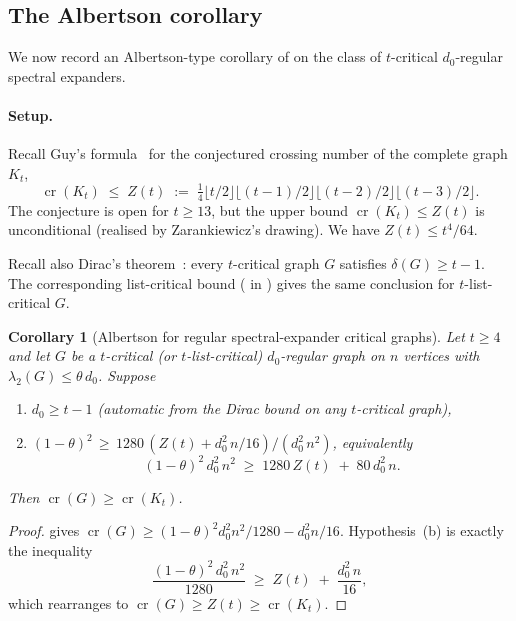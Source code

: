 \documentclass[11pt,a4paper]{article}
\newtheorem{corollary}[theorem]{Corollary}
\theoremstyle{definition}
\DeclareMathOperator{\crN}{cr}
\begin{document}
\subsection{The Albertson corollary}\label{ssec:albertson}

We now record an Albertson-type corollary of 
on the class of $t$-critical $d_0$-regular spectral expanders.

\paragraph{Setup.}
Recall Guy's formula~\cite{Guy} for the conjectured crossing number
of the complete graph $K_t$,
\[
   \crN(K_t) \;\le\; Z(t) \;:=\; \tfrac{1}{4} \lfloor t/2 \rfloor \lfloor (t-1)/2 \rfloor
                 \lfloor (t-2)/2 \rfloor \lfloor (t-3)/2 \rfloor.
\]
The conjecture is open for $t \ge 13$, but the upper bound
$\crN(K_t) \le Z(t)$ is unconditional (realised by Zarankiewicz's
drawing). We have $Z(t) \le t^{4}/64$.

Recall also Dirac's theorem~\cite{Dirac1952}: every $t$-critical
graph $G$ satisfies $\delta(G) \ge t - 1$. The corresponding
list-critical bound ( in
) gives the same conclusion for
$t$-list-critical $G$.

\begin{corollary}[Albertson for regular spectral-expander critical graphs]\label{cor:albertson}
Let $t \ge 4$ and let $G$ be a $t$-critical (or $t$-list-critical)
$d_0$-regular graph on $n$ vertices with
$\lambda_2(G) \le \theta\,d_0$. Suppose
\begin{enumerate}
\item[(a)] $d_0 \ge t - 1$ (automatic from the Dirac bound on
  any $t$-critical graph),
\item[(b)] $(1 - \theta)^{2} \,\ge\, 1280\,(Z(t) + d_0^{2}\,n/16) / (d_0^{2}\,n^{2})$,
  equivalently
  \begin{equation}\label{eq:cor-cond}
     (1 - \theta)^{2}\,d_0^{2}\,n^{2} \;\ge\; 1280\,Z(t) \;+\; 80\,d_0^{2}\,n.
  \end{equation}
\end{enumerate}
Then $\crN(G) \ge \crN(K_t)$.
\end{corollary}

\begin{proof}
 gives $\crN(G) \ge (1 - \theta)^{2} d_0^{2} n^{2} / 1280
- d_0^{2} n / 16$. Hypothesis~(b) is exactly the inequality
\[
   \frac{(1 - \theta)^{2}\,d_0^{2}\,n^{2}}{1280} \;\ge\; Z(t) \;+\; \frac{d_0^{2}\,n}{16},
\]
which rearranges to $\crN(G) \ge Z(t) \ge \crN(K_t)$.
\end{proof}
\end{document}
